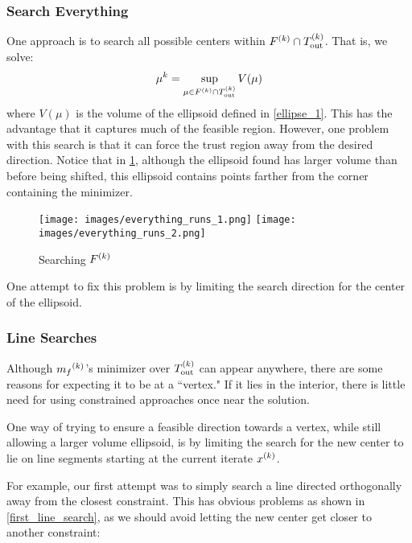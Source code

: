 \subsubsection{Search Everything}

One approach is to search all possible centers within $ {F}^{(k)} \cap {T_{\text{out}}^{(k)}} $.
That is, we solve:
$$\mu^k = \sup_{\mu \in {F}^{(k)} \cap {T_{\text{out}}^{(k)}}} V(\mu)$$
where $V(\mu)$ is the volume of the ellipsoid defined in \cref{ellipse_1}.
This has the advantage that it captures much of the feasible region.
However, one problem with this search is that it can force the trust region away from the desired direction.
Notice that in \cref{ellipse_runs_away}, although the ellipsoid found has larger volume than before being shifted, this ellipsoid contains points farther from the corner containing the minimizer.

\begin{figure}[h]
    \centering
    \texttt{[image: images/everything\_runs\_1.png]}
    \texttt{[image: images/everything\_runs\_2.png]}
    \caption{Searching ${F}^{(k)}$}
    \label{ellipse_runs_away}
\end{figure}


One attempt to fix this problem is by limiting the search direction for the center of the ellipsoid.


\subsubsection{Line Searches}
Although ${{m}_f}^{(k)}$'s minimizer over ${T_{\text{out}}^{(k)}}$  can appear anywhere, there are some reasons for expecting it to be at a ``vertex."
If it lies in the interior, there is little need for using constrained approaches once near the solution.

One way of trying to ensure a feasible direction towards a vertex, while still allowing a larger volume ellipsoid, is by limiting the search for the new center to lie on line segments starting at the current iterate ${x^{(k)}}$.

For example, our first attempt was to simply search a line directed orthogonally away from the closest constraint.
This has obvious problems as shown in \cref{first_line_search}, as we should avoid letting the new center get closer to another constraint:

